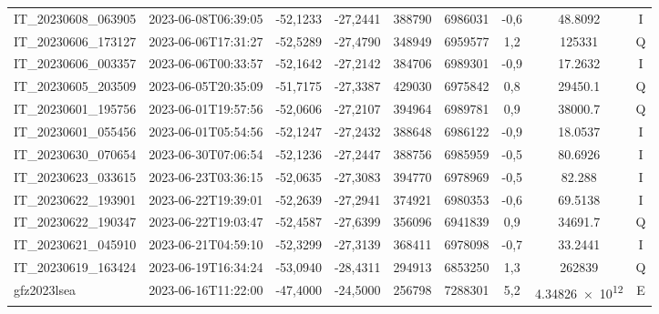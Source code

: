 \begin{center}
\begin{longtable}{lcccccccc}
IT\_20230608\_063905 & 2023-06-08T06:39:05 & -52,1233 & -27,2441 & 388790 & 6986031 & -0,6 & \num[round-precision=3,round-mode=figures,scientific-notation=true]{48.8092} & I \\
IT\_20230606\_173127 & 2023-06-06T17:31:27 & -52,5289 & -27,4790 & 348949 & 6959577 & 1,2 & \num[round-precision=3,round-mode=figures,scientific-notation=true]{125331} & Q \\
IT\_20230606\_003357 & 2023-06-06T00:33:57 & -52,1642 & -27,2142 & 384706 & 6989301 & -0,9 & \num[round-precision=3,round-mode=figures,scientific-notation=true]{17.2632} & I \\
IT\_20230605\_203509 & 2023-06-05T20:35:09 & -51,7175 & -27,3387 & 429030 & 6975842 & 0,8 & \num[round-precision=3,round-mode=figures,scientific-notation=true]{29450.1} & Q \\
IT\_20230601\_195756 & 2023-06-01T19:57:56 & -52,0606 & -27,2107 & 394964 & 6989781 & 0,9 & \num[round-precision=3,round-mode=figures,scientific-notation=true]{38000.7} & Q \\
IT\_20230601\_055456 & 2023-06-01T05:54:56 & -52,1247 & -27,2432 & 388648 & 6986122 & -0,9 & \num[round-precision=3,round-mode=figures,scientific-notation=true]{18.0537} & I \\
IT\_20230630\_070654 & 2023-06-30T07:06:54 & -52,1236 & -27,2447 & 388756 & 6985959 & -0,5 & \num[round-precision=3,round-mode=figures,scientific-notation=true]{80.6926} & I \\
IT\_20230623\_033615 & 2023-06-23T03:36:15 & -52,0635 & -27,3083 & 394770 & 6978969 & -0,5 & \num[round-precision=3,round-mode=figures,scientific-notation=true]{82.288} & I \\
IT\_20230622\_193901 & 2023-06-22T19:39:01 & -52,2639 & -27,2941 & 374921 & 6980353 & -0,6 & \num[round-precision=3,round-mode=figures,scientific-notation=true]{69.5138} & I \\
IT\_20230622\_190347 & 2023-06-22T19:03:47 & -52,4587 & -27,6399 & 356096 & 6941839 & 0,9 & \num[round-precision=3,round-mode=figures,scientific-notation=true]{34691.7} & Q \\
IT\_20230621\_045910 & 2023-06-21T04:59:10 & -52,3299 & -27,3139 & 368411 & 6978098 & -0,7 & \num[round-precision=3,round-mode=figures,scientific-notation=true]{33.2441} & I \\
IT\_20230619\_163424 & 2023-06-19T16:34:24 & -53,0940 & -28,4311 & 294913 & 6853250 & 1,3 & \num[round-precision=3,round-mode=figures,scientific-notation=true]{262839} & Q \\
gfz2023lsea & 2023-06-16T11:22:00 & -47,4000 & -24,5000 & 256798 & 7288301 & 5,2 & \num[round-precision=3,round-mode=figures,scientific-notation=true]{4.34826e+12} & E \\

\end{longtable}
\end{center}
